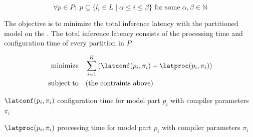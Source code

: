 \begin{description}
    \begin{equation}
        \forall p \in P: \; p \subseteq \{l_i \in L \mid \alpha \leq i \leq \beta\} \; \text{for some} \;  \alpha, \beta \in \mathbb{N}
    \end{equation}
\end{description}

The objective is to minimize the total inference latency with the partitioned model on the \graicore{}.
The total inference latency consists of the processing time and configuration time of every partition in $P$.

\begin{align*}
    \textrm{minimize} & \quad \sum_{i=1}^{K} \left( \latconf(p_i, \pi_i) + \latproc(p_i, \pi_i) \right) \\
    \textrm{subject to} & \quad \textrm{(the contraints above)}
\end{align*}

\begin{eqexpl}[30mm]
    \item{$\latconf(p_i, \pi_i)$} configuration time for model part $p_i$ with compiler parameters $\pi_i$
    \item{$\latproc(p_i, \pi_i)$} processing time for model part $p_i$ with compiler parameters $\pi_i$
\end{eqexpl}

